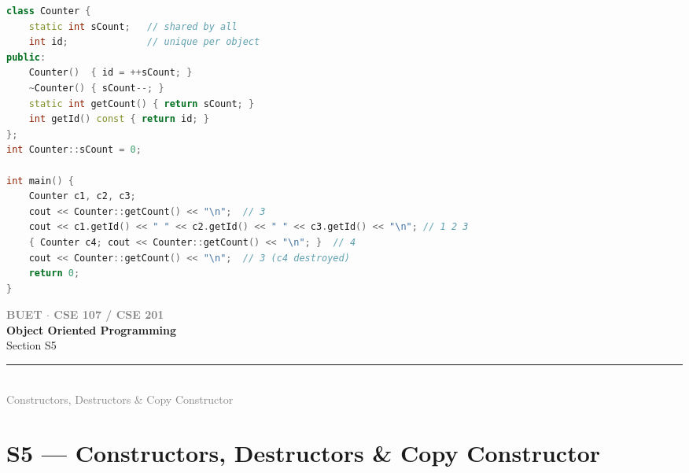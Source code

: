 \documentclass[12pt,a3paper]{article}
\newcommand{\secdivider}[4]{%
  \newpage\thispagestyle{empty}%
  \vspace*{\fill}%
  \begin{tcolorbox}[enhanced,colback=#4!7,colframe=#3,boxrule=1.5pt,arc=8pt,
    left=20pt,right=20pt,top=22pt,bottom=22pt,
    shadow={3pt}{-3pt}{0pt}{black!15}]
    \centering
    {\large\textcolor{gray}{\textbf{BUET $\cdot$ CSE 107 / CSE 201}}}\\[8pt]
    {\fontsize{26}{32}\selectfont\bfseries\textcolor{#3}{Object Oriented Programming}}\\[6pt]
    {\fontsize{15}{19}\selectfont\textcolor{dgray}{#1}}\\[12pt]
    \textcolor{#3!60}{\rule{0.5\textwidth}{0.5pt}}\\[6pt]
    {\small\textcolor{gray}{#2}}
  \end{tcolorbox}%
  \vspace*{\fill}\newpage%
}
\begin{document}
\begin{enumerate}
\begin{tcolorbox}[enhanced,breakable,ansbox,colback=cD!4,colframe=cD,
  boxrule=0.8pt,arc=5pt,
  title={\textbf{Answer --- Static vs non-static class members}},
  fonttitle=\bfseries\color{white},colbacktitle=cD]
\begin{lstlisting}[language=C++]
class Counter {
    static int sCount;   // shared by all
    int id;              // unique per object
public:
    Counter()  { id = ++sCount; }
    ~Counter() { sCount--; }
    static int getCount() { return sCount; }
    int getId() const { return id; }
};
int Counter::sCount = 0;

int main() {
    Counter c1, c2, c3;
    cout << Counter::getCount() << "\n";  // 3
    cout << c1.getId() << " " << c2.getId() << " " << c3.getId() << "\n"; // 1 2 3
    { Counter c4; cout << Counter::getCount() << "\n"; }  // 4
    cout << Counter::getCount() << "\n";  // 3 (c4 destroyed)
    return 0;
}
\end{lstlisting}

\end{tcolorbox}



\end{enumerate}
\newpage

\secdivider{Section S5}{Constructors, Destructors \& Copy Constructor}{cE}{cE}
\label{sec:S5}
\titleformat{\section}{\large\bfseries\color{cE}}{}{0em}{}[\titlerule]
\section{S5 --- Constructors, Destructors \& Copy Constructor}
\end{document}
